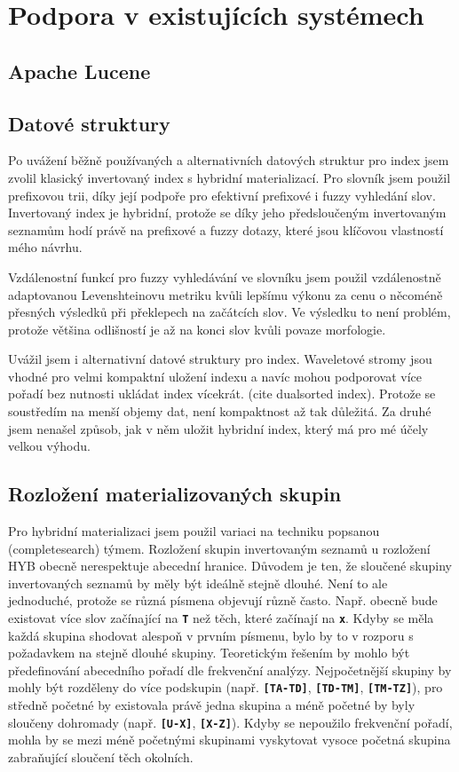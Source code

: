 \documentclass[12pt,letterpaper,oneside,openright]{book}
\newcommand{\bftt}[1]{\texttt{\textbf{#1}}}
\begin{document}
\section{Podpora v existujících systémech}
\subsection{Apache Lucene}


\subsection{Datové struktury}
Po uvážení běžně používaných a alternativních datových struktur pro index jsem
zvolil klasický invertovaný index s hybridní materializací. Pro slovník jsem
použil prefixovou trii, díky její podpoře pro efektivní prefixové i fuzzy
vyhledání slov. Invertovaný index je hybridní, protože se díky jeho
předsloučeným invertovaným seznamům hodí právě na prefixové a fuzzy dotazy,
které jsou klíčovou vlastností mého návrhu.

Vzdálenostní funkcí pro fuzzy vyhledávání ve slovníku jsem použil vzdálenostně
adaptovanou Levenshteinovu metriku kvůli lepšímu výkonu za cenu o něcoméně
přesných výsledků při překlepech na začátcích slov. Ve výsledku to není
problém, protože většina odlišností je až na konci slov kvůli povaze
morfologie.

Uvážil jsem i alternativní datové struktury pro index. Waveletové stromy jsou
vhodné pro velmi kompaktní uložení indexu a navíc mohou podporovat více pořadí
bez nutnosti ukládat index vícekrát. (cite dualsorted index). Protože se
soustředím na menší objemy dat, není kompaktnost až tak důležitá. Za druhé jsem
nenašel způsob, jak v něm uložit hybridní index, který má pro mé účely velkou
výhodu.

\subsection{Rozložení materializovaných skupin}
Pro hybridní materializaci jsem použil variaci na techniku popsanou
(completesearch) týmem. Rozložení skupin invertovaným seznamů u rozložení HYB
obecně nerespektuje abecední hranice. Důvodem je ten, že sloučené skupiny
invertovaných seznamů by měly být ideálně stejně dlouhé. Není to ale
jednoduché, protože se různá písmena objevují různě často. Např. obecně bude
existovat více slov začínající na \bftt{T} než těch, které začínají na
\bftt{x}. Kdyby se měla každá skupina shodovat alespoň v prvním písmenu, bylo
by to v rozporu s požadavkem na stejně dlouhé skupiny. Teoretickým řešením by
mohlo být předefinování abecedního pořadí dle frekvenční analýzy. Nejpočetnější
skupiny by mohly být rozděleny do více podskupin (např. \bftt{[TA-TD]},
\bftt{[TD-TM]}, \bftt{[TM-TZ]}), pro středně početné by existovala právě jedna
skupina a méně početné by byly sloučeny dohromady (např. \bftt{[U-X]},
\bftt{[X-Z]}). Kdyby se nepoužilo frekvenční pořadí, mohla by se mezi méně
početnými skupinami vyskytovat vysoce početná skupina zabraňující sloučení těch
okolních.
\end{document}

